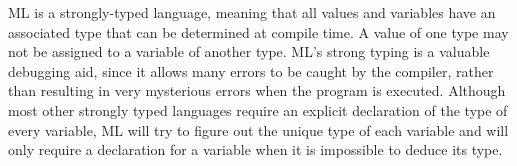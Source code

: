 
ML is a strongly-typed language, meaning that all values and 
variables have an associated type that can be determined at 
compile time. \cite{ullman} A value of one type may not be 
assigned to a variable of another type.  \cite{ullman} 
ML's strong typing is a valuable debugging aid, since it 
allows many errors to be caught by the compiler, rather 
than resulting in very mysterious errors when the program
is executed.  Although most other strongly typed languages 
require an explicit declaration of the type of every 
variable, ML will try to figure out the unique type of each    
variable and will only require a declaration for a variable 
when it is impossible to deduce its type.  \cite{ullman}



